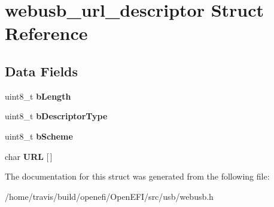 \hypertarget{structwebusb__url__descriptor}{}\section{webusb\+\_\+url\+\_\+descriptor Struct Reference}
\label{structwebusb__url__descriptor}
\subsection*{Data Fields}
\begin{DoxyCompactItemize}
\item 
\mbox{\label{structwebusb__url__descriptor_ab7745662fbfaa2dd39bfab51bc390d8c}} 
uint8\+\_\+t {\bfseries b\+Length}
\item 
\mbox{\label{structwebusb__url__descriptor_a52bd4b2085d6e379146dbc89413390e4}} 
uint8\+\_\+t {\bfseries b\+Descriptor\+Type}
\item 
\mbox{\label{structwebusb__url__descriptor_a5a4ffe81a4930cc9ff5ff49d5539e4fd}} 
uint8\+\_\+t {\bfseries b\+Scheme}
\item 
\mbox{\label{structwebusb__url__descriptor_a09a054c3d67753d6bd88eb02d0583ae2}} 
char {\bfseries U\+RL} \mbox{[}$\,$\mbox{]}
\end{DoxyCompactItemize}


The documentation for this struct was generated from the following file\+:\begin{DoxyCompactItemize}
\item 
/home/travis/build/openefi/\+Open\+E\+F\+I/src/usb/webusb.\+h\end{DoxyCompactItemize}
